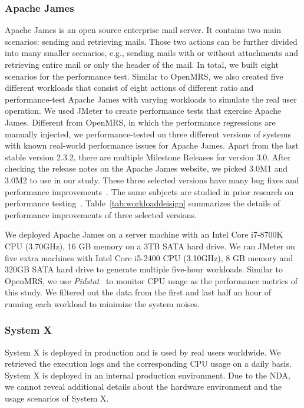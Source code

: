 \subsubsection{Apache James}
Apache James is an open source enterprise mail server. It contains two main scenarios: sending and retrieving mails. Those two actions can be further divided into many smaller scenarios, e.g., sending mails with or without attachments and retrieving entire mail or only the header of the mail. In total, we built eight scenarios for the performance test. Similar to OpenMRS, we also created five different workloads that consist of eight actions of different ratio and performance-test Apache James with varying workloads to simulate the real user operation. We used JMeter to create performance tests that exercise Apache James. Different from OpenMRS, in which the performance regressions are manually injected, we performance-tested on three different versions of systems with known real-world performance issues for Apache James. Apart from the last stable version 2.3.2, there are multiple Milestone Releases for version 3.0. After checking the release notes on the Apache James website, we picked 3.0M1 and 3.0M2 to use in our study. These three selected versions have many bug fixes and performance improvements~\citep{Apache-James}. The same subjects are studied in prior research on performance testing~\citep{DBLP:conf/icst/GaoJBL16}. Table~\ref{tab:workloaddeisign} summarizes the details of performance improvements of three selected versions. 

We deployed Apache James on a server machine with an Intel Core i7-8700K CPU (3.70GHz), 16 GB memory on a 3TB SATA hard drive. We ran JMeter on five extra machines with Intel Core i5-2400 CPU (3.10GHz), 8 GB memory and 320GB SATA hard drive to generate multiple five-hour workloads. Similar to OpenMRS, we use \emph{Pidstat}~\citep{pidstat} to monitor CPU usage as the performance metrics of this study. We filtered out the data from the first and last half an hour of running each workload to minimize the system noises. 

\subsubsection{System X}
System X is deployed in production and is used by real users worldwide. We retrieved the execution logs and the corresponding CPU usage on a daily basis. System X is deployed in an internal production environment. Due to the NDA, we cannot reveal additional details about the hardware environment and the usage scenarios of System X.

